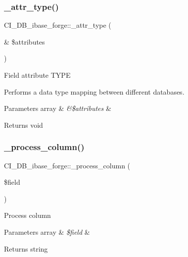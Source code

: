 \subsubsection{\texorpdfstring{\+\_\+attr\+\_\+type()}{\_attr\_type()}}
{\footnotesize\ttfamily C\+I\+\_\+\+D\+B\+\_\+ibase\+\_\+forge\+::\+\_\+attr\+\_\+type (\begin{DoxyParamCaption}\item[{\&}]{\$attributes }\end{DoxyParamCaption})\hspace{0.3cm}{\ttfamily [protected]}}

Field attribute T\+Y\+PE

Performs a data type mapping between different databases.


\begin{DoxyParams}[1]{Parameters}
array & {\em \&\$attributes} & \\
\hline
\end{DoxyParams}
\begin{DoxyReturn}{Returns}
void 
\end{DoxyReturn}
\mbox{\label{class_c_i___d_b__ibase__forge_ab1bb408da415884311bec74008790721}} 
\subsubsection{\texorpdfstring{\+\_\+process\+\_\+column()}{\_process\_column()}}
{\footnotesize\ttfamily C\+I\+\_\+\+D\+B\+\_\+ibase\+\_\+forge\+::\+\_\+process\+\_\+column (\begin{DoxyParamCaption}\item[{}]{\$field }\end{DoxyParamCaption})\hspace{0.3cm}{\ttfamily [protected]}}

Process column


\begin{DoxyParams}[1]{Parameters}
array & {\em \$field} & \\
\hline
\end{DoxyParams}
\begin{DoxyReturn}{Returns}
string 
\end{DoxyReturn}
\mbox{\label{class_c_i___d_b__ibase__forge_a5f2de7626b88b0cb7ae9b1ff152208e5}} 

